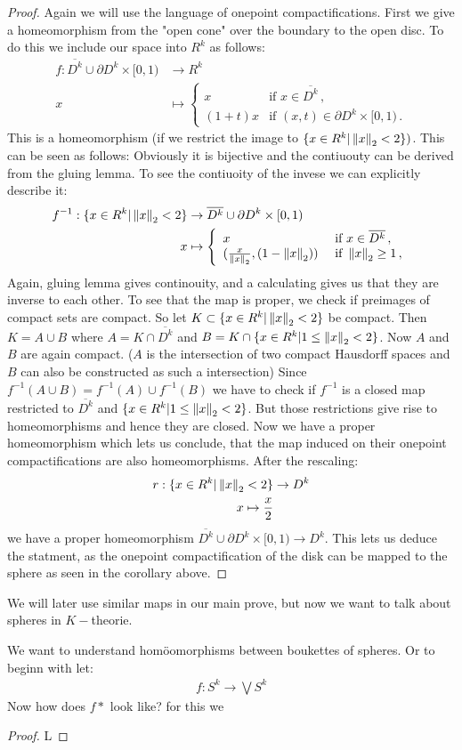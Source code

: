 \begin{proof}
	Again we will use the language of onepoint compactifications. First we give a homeomorphism from the "open cone" over the boundary to the open disc. To do this we include our space into $R^k$ as follows:
	\begin{align*}
	f:	\overline{D^k}\cup \partial D^k \times [0,1) &\to R^{k}\\
		x								 &\mapsto
		 \left\{ \begin{array}{ll}
		 	x & \text{if } x \in \overline{D^k} \, , \\
		 	(1+t)x& \text{if } (x,t)\in \partial D^k \times [0,1) \, . 
		 \end{array}
		 \right.
	\end{align*} This is a homeomorphism (if we restrict the image to $\{x\in R^k| \left\lVert x\right\rVert_2<2\})$. This can be seen as follows:
	Obviously it is bijective and the contiuouty can be derived from the gluing lemma. To see the contiuoity of the invese we can explicitly describe it:
\begin{align*}
	f^{-1}: \{x\in R^k| \left\lVert x\right\rVert_2<2\}  &\to    \overline{D^k}\cup \partial D^k \times [0,1) \\
	x 									&\mapsto \left\{ 
	\begin{array}{ll}
		x & \text{ if } x\in \overline{D^k} \,,  \\
		(\frac{x}{\left\lVert x\right\rVert_2},(1-\left\lVert x\right\rVert_2)) & \text{ if } \left\lVert x\right\rVert_2\geq 1 \,,
	\end{array}
	\right.
\end{align*} Again, gluing lemma gives continouity, and a calculating gives us that they are inverse to each other. To see that the map is proper, we check if preimages of compact sets are compact. So let $K\subset \{x\in R^k| \left\lVert x\right\rVert_2<2\}$ be compact. Then $K=A\cup B$ where $A= K\cap \overline{D^k}$ and $B=K\cap \{x\in R^k| 1\leq \left\lVert x\right\rVert_2<2\}$. Now $A$ and $B$ are again compact. ($A$ is the intersection of two compact Hausdorff spaces and $B$ can also be constructed as such a intersection) Since $f^{-1}(A\cup B)=f^{-1}(A)\cup f^{-1}(B)$ we have to check if $f^{-1}$ is a closed map restricted to $\overline{D^k}$ and $\{x\in R^k| 1\leq \left\lVert x\right\rVert_2<2\}$. But those restrictions give rise to homeomorphisms and hence they are closed. 
Now we have a proper homeomorphism which lets us conclude, that the map induced on their onepoint compactifications are also homeomorphisms.  After the rescaling:
\begin{align*}
	r: \{x\in R^k| \left\lVert x\right\rVert_2<2\} & \to D^k\\
	x\mapsto \frac{x}{2}
\end{align*} we have a proper homeomorphism $\overline{D^k}\cup \partial D^k \times [0,1) \to D^k$.
This lets us deduce the statment, as the onepoint compactification of the disk can be mapped to the sphere as seen in the corollary above.
\end{proof}
We will later use similar maps in our main prove, but now we want to talk about spheres in $K-$theorie. 

\begin{cor}
We want to understand homöomorphisms between boukettes of spheres. Or to beginn with let:
\begin{align*}
	f:S^k\to \bigvee S^k
\end{align*}
Now how does $f*$ look like? for this we
\end{cor}
\begin{proof}
	L
\end{proof}
